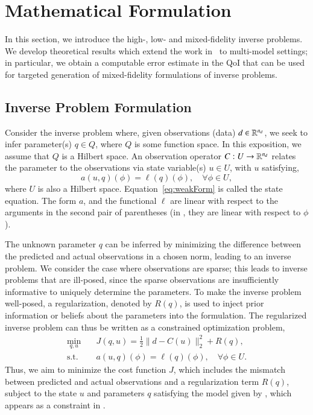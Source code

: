 \section{Mathematical Formulation}\label{sec:form}
%
In this section, we introduce the high-, low- and mixed-fidelity inverse problems. We develop theoretical results which extend the work in~\cite{BecVex05} to multi-model settings; in particular, we obtain a computable error estimate in the QoI that can be used for targeted generation of mixed-fidelity formulations of inverse problems.

\subsection{Inverse Problem Formulation}  \label{sec:setup}
%
Consider the inverse problem where, given observations (data) $d\in{\mathbb{R}}^{n_d}$, we seek to infer parameter(s) $q\in Q$, where $Q$ is some function space. In this exposition, we assume that $Q$ is a Hilbert space. An observation operator $C:U\to{\mathbb{R}}^{n_d}$ relates the parameter to the observations via state variable(s) $u\in U$, with $u$ satisfying,
%
\begin{equation}
a(u,q)(\phi)=\ell(q)(\phi),\quad\forall\phi\in U,
\label{eq:weakForm}
\end{equation}
%
where $U$ is also a Hilbert space. Equation~\ref{eq:weakForm} is called the state equation. The form $a$, and the functional $\ell$ are linear with respect to the arguments in the second pair of parentheses (in , they are linear with respect to $\phi$).

The unknown parameter $q$ can be inferred by minimizing the difference between the predicted and actual observations in a chosen norm, leading to an inverse problem. We consider the case where observations are sparse; this leads to inverse problems that are ill-posed, since the sparse observations are insufficiently informative to uniquely determine the parameters. To make the inverse problem well-posed, a regularization, denoted by $R(q)$, is used to inject prior information or beliefs about the parameters into the formulation. The regularized inverse problem can thus be written as a constrained optimization problem,
%
\begin{subequations}
\label{eq:invOpt}
\begin{align}
\min\limits_{q,u} & \quad J(q,u)=\frac{1}{2}\|d-C(u)\|_2^2 + R(q), \label{eq:invOpt_obj} \\
\textrm{s.t. }& \quad a(u,q)(\phi)=\ell(q)(\phi),\quad\forall\phi\in U. \label{eq:invOpt_cons}
\end{align}
\end{subequations}
%
Thus, we aim to minimize the cost function $J$, which includes the mismatch between predicted and actual observations and a regularization term $R(q)$, subject to the state $u$ and parameters $q$ satisfying the model given by , which appears as a constraint in .

